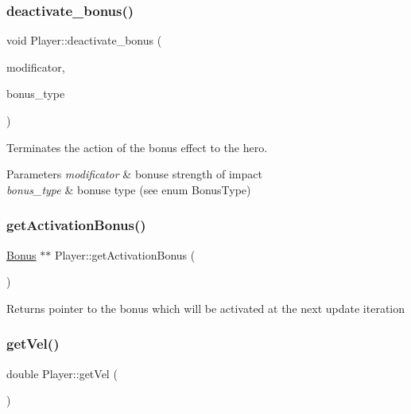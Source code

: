\subsubsection{\texorpdfstring{deactivate\+\_\+bonus()}{deactivate\_bonus()}}
{\footnotesize\ttfamily void Player\+::deactivate\+\_\+bonus (\begin{DoxyParamCaption}\item[{double}]{modificator,  }\item[{\hyperlink{_bonus_8h_ad6d58ebabfbf9aa4181bfe97a5d8d984}{Bonus\+Type}}]{bonus\+\_\+type }\end{DoxyParamCaption})}



Terminates the action of the bonus effect to the hero. 


\begin{DoxyParams}{Parameters}
{\em modificator} & bonuse strength of impact \\
\hline
{\em bonus\+\_\+type} & bonuse type (see enum Bonus\+Type) \\
\hline
\end{DoxyParams}
\mbox{\label{class_player_ab62b84f866fb3075bfbf8ea455d73375}} 
\subsubsection{\texorpdfstring{get\+Activation\+Bonus()}{getActivationBonus()}}
{\footnotesize\ttfamily \hyperlink{class_bonus}{Bonus} $\ast$$\ast$ Player\+::get\+Activation\+Bonus (\begin{DoxyParamCaption}{ }\end{DoxyParamCaption})}

\begin{DoxyReturn}{Returns}
pointer to the bonus which will be activated at the next update iteration 
\end{DoxyReturn}
\mbox{\label{class_player_afbabae83ae2b21caf794efa91e26c37d}} 
\subsubsection{\texorpdfstring{get\+Vel()}{getVel()}}
{\footnotesize\ttfamily double Player\+::get\+Vel (\begin{DoxyParamCaption}{ }\end{DoxyParamCaption})}

